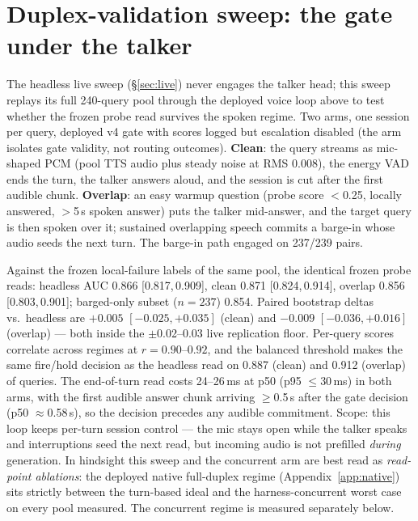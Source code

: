 \section{Duplex-validation sweep: the gate under the talker}
\label{app:duplexval}

The headless live sweep (\S\ref{sec:live}) never engages the talker
head; this sweep replays its full 240-query pool through the deployed
voice loop above to test whether the frozen probe read survives the
spoken regime. Two arms, one session per query, deployed v4 gate with
scores logged but escalation disabled (the arm isolates gate validity,
not routing outcomes). \textbf{Clean}: the query streams as
mic-shaped PCM (pool TTS audio plus steady noise at RMS 0.008), the
energy VAD ends the turn, the talker answers aloud, and the session is
cut after the first audible chunk. \textbf{Overlap}: an easy warmup
question (probe score $<$0.25, locally answered, $>$5\,s spoken answer)
puts the talker mid-answer, and the target query is then spoken over
it; sustained overlapping speech commits a barge-in whose audio seeds
the next turn. The barge-in path engaged on 237/239 pairs.

Against the frozen local-failure labels of the same pool, the
identical frozen probe reads: headless AUC 0.866 [0.817,\,0.909], clean
0.871 [0.824,\,0.914], overlap 0.856 [0.803,\,0.901]; barged-only subset
($n{=}237$) 0.854. Paired bootstrap deltas vs.\ headless are $+0.005$
$[-0.025,+0.035]$ (clean) and $-0.009$ $[-0.036,+0.016]$ (overlap) --- both
inside the $\pm$0.02--0.03 live replication floor. Per-query scores
correlate across regimes at $r{=}0.90$--$0.92$, and the balanced
threshold makes the same fire/hold decision as the headless read on
0.887 (clean) and 0.912 (overlap) of queries. The end-of-turn read costs
24--26\,ms at p50 (p95 $\le$30\,ms) in both arms, with the first
audible answer chunk arriving $\ge$0.5\,s after the gate decision
(p50 $\approx$0.58\,s), so the decision precedes any audible
commitment. Scope: this loop keeps per-turn session control --- the mic
stays open while the talker speaks and interruptions seed the next
read, but incoming audio is not prefilled \emph{during} generation.
In hindsight this sweep and the concurrent arm are best read as
\emph{read-point ablations}: the deployed native full-duplex regime
(Appendix~\ref{app:native}) sits strictly between the turn-based
ideal and the harness-concurrent worst case on every pool measured.
The concurrent regime is measured separately below.

